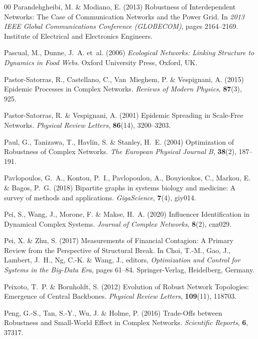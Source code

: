 \documentclass{comnet-mod}
\begin{document}
\begin{thebibliography}{00}
Parandehgheibi, M. {\&} Modiano, E. (2013)  {Robustness of Interdependent
  Networks: {{The}} Case of Communication Networks and the Power Grid}. In {\em
  {2013 {{IEEE}} Global Communications Conference ({{GLOBECOM}})}}, pages
  2164--2169. {Institute of Electrical and Electronics Engineers}.

Pascual, M., Dunne, J.~A.  et~al. (2006) {\em {Ecological Networks: {{Linking}}
  Structure to Dynamics in Food Webs}}.
{Oxford University Press}, {Oxford, UK}.

{Pastor-Satorras}, R., Castellano, C., Van~Mieghem, P. {\&} Vespignani, A.
  (2015)  {Epidemic Processes in Complex Networks}. {\em {Reviews of Modern
  Physics}}, \textbf{87}(3), 925.

{Pastor-Satorras}, R. {\&} Vespignani, A. (2001)  {Epidemic Spreading in
  Scale-Free Networks}. {\em {Physical Review Letters}}, \textbf{86}(14),
  3200--3203.

Paul, G., Tanizawa, T., Havlin, S. {\&} Stanley, H.~E. (2004)  {Optimization of
  Robustness of Complex Networks}. {\em {The European Physical Journal B}},
  \textbf{38}(2), 187--191.

Pavlopoulos, G.~A., Kontou, P.~I., Pavlopoulou, A., Bouyioukos, C., Markou, E.
  {\&} Bagos, P.~G. (2018)  {Bipartite graphs in systems biology and medicine:
  A survey of methods and applications}. {\em GigaScience}, \textbf{7}(4),
  giy014.

Pei, S., Wang, J., Morone, F. {\&} Makse, H.~A. (2020)  {Influencer
  Identification in Dynamical Complex Systems}. {\em {Journal of Complex
  Networks}}, \textbf{8}(2), cnz029.

Pei, X. {\&} Zhu, S. (2017)  {Measurements of Financial Contagion: {{A}}
  Primary Review from the Perspective of Structural Break}. In Choi, T.-M.,
  Gao, J., Lambert, J.~H., Ng, C.-K. {\&} Wang, J., editors, {\em {Optimization
  and Control for Systems in the Big-Data Era}}, pages 61--84.
  {Springer-Verlag}, Heidelberg, Germany.

Peixoto, T.~P. {\&} Bornholdt, S. (2012)  {Evolution of Robust Network
  Topologies: {{Emergence}} of Central Backbones}. {\em {Physical Review
  Letters}}, \textbf{109}(11), 118703.

Peng, G.-S., Tan, S.-Y., Wu, J. {\&} Holme, P. (2016)  {Trade-Offs between
  Robustness and Small-World Effect in Complex Networks}. {\em {Scientific
  Reports}}, \textbf{6}, 37317.


\end{thebibliography}
\end{document}
